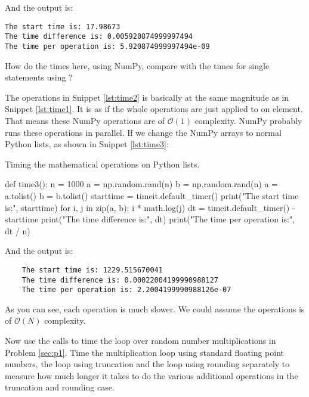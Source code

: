 And the output is:

\begin{verbatim}
The start time is: 17.98673
The time difference is: 0.005920874999997494
The time per operation is: 5.920874999997494e-09
\end{verbatim}

\Question How do the times here, using NumPy, compare with the times for single
statements using ?

\Answer The operations in Snippet \ref{lst:time2} is basically at the same magnitude as
in Snippet \ref{lst:time1}. It is as if the whole operations are just applied to
on element. That means these NumPy operations are of $\mathcal{O}(1)$ complexity.
NumPy probably runs these operations in parallel.
If we change the NumPy arrays to normal Python lists, as shown in Snippet \ref{lst:time3}:

\begin{algorithm}[H]
    \caption{Timing the mathematical operations on Python lists.}
    \label{lst:time3}
    \begin{pythoncode}
        def time3():
            n = 1000
            a = np.random.rand(n)
            b = np.random.rand(n)
            a = a.tolist()
            b = b.tolist()
            starttime = timeit.default_timer()
            print("The start time is:", starttime)
            for i, j in zip(a, b):
                i * math.log(j)
            dt = timeit.default_timer() - starttime
            print("The time difference is:", dt)
            print("The time per operation is:", dt / n)
        \end{pythoncode}
\end{algorithm}

And the output is:

\begin{verbatim}
    The start time is: 1229.515670041
    The time difference is: 0.00022004199990988127
    The time per operation is: 2.2004199990988126e-07
\end{verbatim}

As you can see, each operation is much slower. We could assume the operations is
of $\mathcal{O}(N)$ complexity.

\Question Now use the  calls to time the loop over random number
multiplications in Problem \ref{sec:p1}. Time the multiplication loop using standard
floating point numbers, the loop using truncation and the loop using rounding separately to
measure how much longer it takes to do the various additional operations in the truncation
and rounding case.

